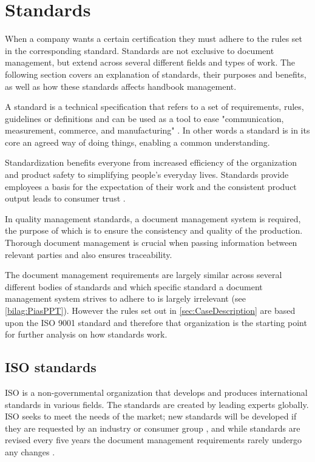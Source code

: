 \section{Standards} \label{sec:standards}
When a company wants a certain certification they must adhere to the rules set in the corresponding standard.
Standards are not exclusive to document management, but extend across several different fields and types of work.
The following section covers an explanation of standards, their purposes and benefits, as well as how these standards affects handbook management.

A standard is a technical specification that refers to a set of requirements, rules, guidelines or definitions \citep[p.~5]{Standard} and can be used as a tool to ease "communication, measurement, commerce, and manufacturing" \cite{Standardtool}.
In other words a standard is in its core an agreed way of doing things, enabling a common understanding.

Standardization benefits everyone from increased efficiency of the organization and product safety to simplifying people's everyday lives.
Standards provide employees a basis for the expectation of their work and the consistent product output leads to consumer trust \citep[p.~83]{Standardization}.

In quality management standards, a document management system is required, the purpose of which is to ensure the consistency and quality of the production.
Thorough document management is crucial when passing information between relevant parties and also ensures traceability.

The document management requirements are largely similar across several different bodies of standards and which specific standard a document management system strives to adhere to is largely irrelevant (see \cref{bilag:PiasPPT}).
However the rules set out in \cref{sec:CaseDescription} are based upon the ISO 9001 standard and therefore that organization is the starting point for further analysis on how standards work.

\subsection{ISO standards} \label{sec:ISOstandards}
ISO is a non-governmental organization that develops and produces international standards in various fields.
The standards are created by leading experts globally. \cite{ISOinfo}
ISO seeks to meet the needs of the market; new standards will be developed if they are requested by an industry or consumer group \cite{ISOdeveloping}, and while standards are revised every five years the document management requirements rarely undergo any changes \cite{ISOreviewedevery5years} \textcolor{red}{\cite{Ipsenfirstinterview}}.

